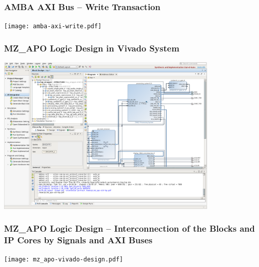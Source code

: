 \documentclass{beamer}
\begin{document}
\begin{frame}
\frametitle{AMBA AXI Bus -- Write Transaction}

\begin{center}
\texttt{[image: amba-axi-write.pdf]}
\end{center}

\end{frame}

\begin{frame}
\frametitle{MZ\_APO Logic Design in Vivado System}
  \begin{center}
    \includegraphics[width=0.8\textwidth]{fig/mz_apo-vivado-screenshot.png}
  \end{center}
\end{frame}

\begin{frame}
\frametitle{MZ\_APO Logic Design -- Interconnection of the Blocks and IP Cores by Signals and AXI Buses}

\texttt{[image: mz\_apo-vivado-design.pdf]}

\end{frame}
\end{document}
